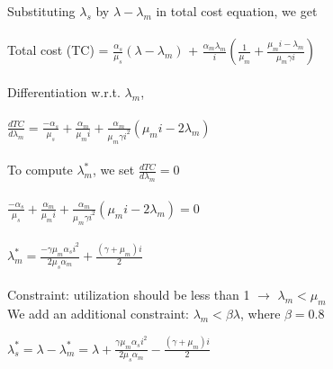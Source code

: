 \documentclass[letter,11pt]{article}
\begin{document}
\begin{itemize}
Substituting $\lambda_s$ by $\lambda - \lambda_m$ in total cost equation, we get\\ \\
Total cost (TC) = $\frac{\alpha_s}{\mu_s}(\lambda - \lambda_m)$ + $\frac{\alpha_m \lambda_m}{i} (\frac{1}{\mu_m} + \frac{\mu_m i - \lambda_m}{\mu_m \gamma i})$ \\ \\
Differentiation w.r.t. $\lambda_m$, \\ \\
$\frac{d TC}{d \lambda_m} = \frac{- \alpha_s}{\mu_s} + \frac{\alpha_m}{\mu_m i} + \frac{\alpha_m}{\mu_m \gamma i^2}(\mu_m i - 2 \lambda_m)$ \\ \\
To compute $\lambda_m^{*}$, we set $\frac{d TC}{d \lambda_m} = 0$ \\ \\
$\frac{- \alpha_s}{\mu_s} + \frac{\alpha_m}{\mu_m i} + \frac{\alpha_m}{\mu_m \gamma i^2}(\mu_m i - 2 \lambda_m) = 0$ \\ \\ 
$\lambda_m^{*} = \frac{- \gamma \mu_m \alpha_s i^2}{2 \mu_s \alpha_m} + \frac{(\gamma + \mu_m)i}{2}$ \\ \\
Constraint: utilization should be less than 1 $\rightarrow$ $\lambda_m < \mu_m$\\  
We add an additional constraint: $\lambda_m < \beta \lambda$, where $\beta = 0.8$

$\lambda_s^{*} = \lambda - \lambda_m^{*} = \lambda + \frac{\gamma \mu_m \alpha_s i^2}{2 \mu_s \alpha_m} - \frac{(\gamma + \mu_m)i}{2}$

\end{itemize}
\end{document}
